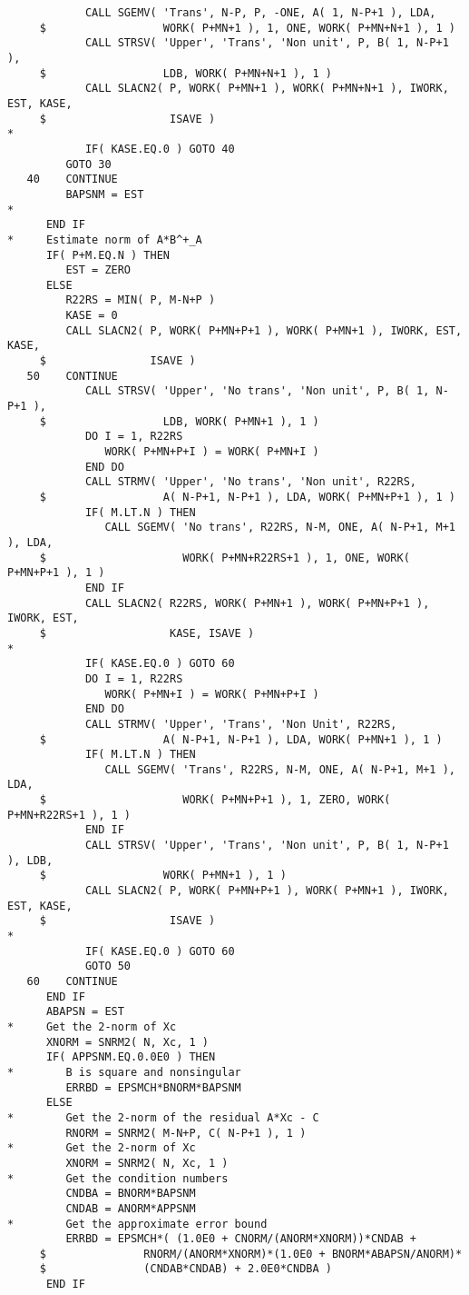 {\begin{verbatim}
            CALL SGEMV( 'Trans', N-P, P, -ONE, A( 1, N-P+1 ), LDA,
     $                  WORK( P+MN+1 ), 1, ONE, WORK( P+MN+N+1 ), 1 )
            CALL STRSV( 'Upper', 'Trans', 'Non unit', P, B( 1, N-P+1 ),
     $                  LDB, WORK( P+MN+N+1 ), 1 )
            CALL SLACN2( P, WORK( P+MN+1 ), WORK( P+MN+N+1 ), IWORK, EST, KASE,
     $                   ISAVE )
*
            IF( KASE.EQ.0 ) GOTO 40
         GOTO 30
   40    CONTINUE
         BAPSNM = EST
*
      END IF
*     Estimate norm of A*B^+_A
      IF( P+M.EQ.N ) THEN
         EST = ZERO
      ELSE
         R22RS = MIN( P, M-N+P )
         KASE = 0
         CALL SLACN2( P, WORK( P+MN+P+1 ), WORK( P+MN+1 ), IWORK, EST, KASE, 
     $                ISAVE )
   50    CONTINUE
            CALL STRSV( 'Upper', 'No trans', 'Non unit', P, B( 1, N-P+1 ),
     $                  LDB, WORK( P+MN+1 ), 1 )
            DO I = 1, R22RS
               WORK( P+MN+P+I ) = WORK( P+MN+I )
            END DO
            CALL STRMV( 'Upper', 'No trans', 'Non unit', R22RS,
     $                  A( N-P+1, N-P+1 ), LDA, WORK( P+MN+P+1 ), 1 )
            IF( M.LT.N ) THEN
               CALL SGEMV( 'No trans', R22RS, N-M, ONE, A( N-P+1, M+1 ), LDA,
     $                     WORK( P+MN+R22RS+1 ), 1, ONE, WORK( P+MN+P+1 ), 1 )
            END IF
            CALL SLACN2( R22RS, WORK( P+MN+1 ), WORK( P+MN+P+1 ), IWORK, EST,
     $                   KASE, ISAVE )
*
            IF( KASE.EQ.0 ) GOTO 60
            DO I = 1, R22RS
               WORK( P+MN+I ) = WORK( P+MN+P+I )
            END DO
            CALL STRMV( 'Upper', 'Trans', 'Non Unit', R22RS,
     $                  A( N-P+1, N-P+1 ), LDA, WORK( P+MN+1 ), 1 )
            IF( M.LT.N ) THEN
               CALL SGEMV( 'Trans', R22RS, N-M, ONE, A( N-P+1, M+1 ), LDA,
     $                     WORK( P+MN+P+1 ), 1, ZERO, WORK( P+MN+R22RS+1 ), 1 )
            END IF
            CALL STRSV( 'Upper', 'Trans', 'Non unit', P, B( 1, N-P+1 ), LDB,
     $                  WORK( P+MN+1 ), 1 )
            CALL SLACN2( P, WORK( P+MN+P+1 ), WORK( P+MN+1 ), IWORK, EST, KASE,
     $                   ISAVE )
*
            IF( KASE.EQ.0 ) GOTO 60
            GOTO 50
   60    CONTINUE
      END IF
      ABAPSN = EST
*     Get the 2-norm of Xc
      XNORM = SNRM2( N, Xc, 1 )
      IF( APPSNM.EQ.0.0E0 ) THEN
*        B is square and nonsingular
         ERRBD = EPSMCH*BNORM*BAPSNM
      ELSE
*        Get the 2-norm of the residual A*Xc - C
         RNORM = SNRM2( M-N+P, C( N-P+1 ), 1 )
*        Get the 2-norm of Xc
         XNORM = SNRM2( N, Xc, 1 )
*        Get the condition numbers
         CNDBA = BNORM*BAPSNM
         CNDAB = ANORM*APPSNM
*        Get the approximate error bound
         ERRBD = EPSMCH*( (1.0E0 + CNORM/(ANORM*XNORM))*CNDAB +
     $               RNORM/(ANORM*XNORM)*(1.0E0 + BNORM*ABAPSN/ANORM)*
     $               (CNDAB*CNDAB) + 2.0E0*CNDBA )
      END IF
\end{verbatim}
}


